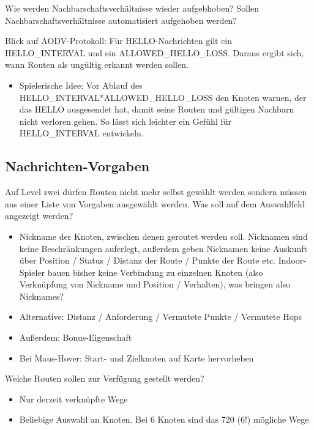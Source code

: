 Wie werden Nachbarschaftsverhältnisse wieder aufgebhoben? Sollen Nachbarschaftsverhältnisse automatisiert aufgehoben werden?

Blick auf AODV-Protokoll: Für HELLO-Nachrichten gilt ein HELLO_INTERVAL und ein ALLOWED_HELLO_LOSS. Daraus ergibt sich, wann Routen als ungültig erkannt werden sollen.

\begin{itemize}
	\item Spielerische Idee: Vor Ablauf des HELLO_INTERVAL*ALLOWED_HELLO_LOSS den Knoten warnen, der das HELLO ausgesendet hat, damit seine Routen und gültigen Nachbarn nicht verloren gehen. So lässt sich leichter ein Gefühl für HELLO_INTERVAL entwickeln.
\end{itemize}

\subsection{Nachrichten-Vorgaben}
Auf Level zwei dürfen Routen nicht mehr selbst gewählt werden sondern müssen aus einer Liste von Vorgaben ausgewählt werden. Was soll auf dem Auswahlfeld angezeigt werden?

\begin{itemize}
	\item Nickname der Knoten, zwischen denen geroutet werden soll. Nicknamen sind keine Beschränkungen auferlegt, außerdem geben Nicknamen keine Auskunft über Position / Status / Distanz der Route / Punkte der Route etc. Indoor-Spieler bauen bisher keine Verbindung zu einzelnen Knoten (also Verknüpfung von Nickname und Position / Verhalten), was bringen also Nicknames?
	\item Alternative: Distanz / Anforderung / Vermutete Punkte / Vermutete Hops
	\item Außerdem: Bonus-Eigenschaft
	\item Bei Maus-Hover: Start- und Zielknoten auf Karte hervorheben
\end{itemize}

Welche Routen sollen zur Verfügung gestellt werden?

\begin{itemize}
	\item Nur derzeit verknüpfte Wege
	\item Beliebige Auswahl an Knoten. Bei 6 Knoten sind das 720 (6!) mögliche Wege
\end{itemize}
